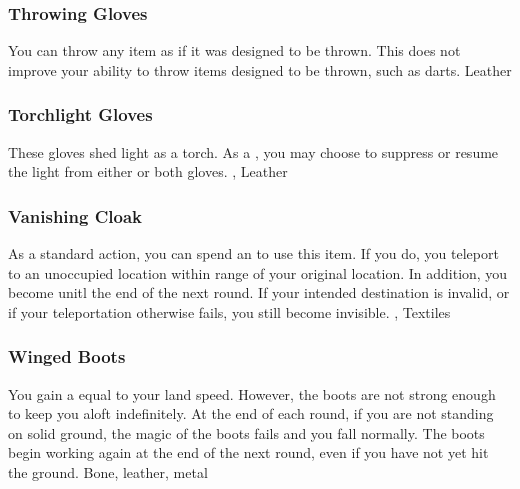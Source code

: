 \lowercase{\hypertarget{item:Throwing Gloves}{}}\label{item:Throwing Gloves}
\hypertarget{item:Throwing Gloves}{\subsubsection{Throwing Gloves\hfill{}}}
You can throw any item as if it was designed to be thrown.
This does not improve your ability to throw items designed to be thrown, such as darts.
 
 Leather
\lowercase{\hypertarget{item:Torchlight Gloves}{}}\label{item:Torchlight Gloves}
\hypertarget{item:Torchlight Gloves}{\subsubsection{Torchlight Gloves\hfill{}}}
These gloves shed light as a torch.
As a , you may choose to suppress or resume the light from either or both gloves.
 , 
 Leather
\lowercase{\hypertarget{item:Vanishing Cloak}{}}\label{item:Vanishing Cloak}
\hypertarget{item:Vanishing Cloak}{\subsubsection{Vanishing Cloak\hfill{}}}
As a standard action, you can spend an  to use this item.
If you do, you teleport to an unoccupied location within \rngmed range of your original location.
In addition, you become  unitl the end of the next round.
If your intended destination is invalid, or if your teleportation otherwise fails, you still become invisible.
 , 
 Textiles
\lowercase{\hypertarget{item:Winged Boots}{}}\label{item:Winged Boots}
\hypertarget{item:Winged Boots}{\subsubsection{Winged Boots\hfill{}}}
You gain a  equal to your land speed.
However, the boots are not strong enough to keep you aloft indefinitely.
At the end of each round, if you are not standing on solid ground, the magic of the boots fails and you fall normally.
The boots begin working again at the end of the next round, even if you have not yet hit the ground.
 
 Bone, leather, metal
